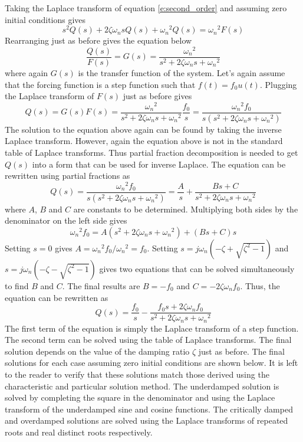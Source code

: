 Taking the Laplace transform of equation \ref{e:second_order} and assuming zero initial conditions gives
\begin{equation}
    s^2 Q(s) + 2\zeta \omega_n s Q(s) + {\omega_n}^2 Q(s) = {\omega_n}^2 F(s)
\end{equation}
Rearranging just as before gives the equation below 
\begin{equation}
    \frac{Q(s)}{F(s)} = G(s) = \frac{{\omega_n}^2}{s^2 + 2\zeta \omega_n s + {\omega_n}^2}
\end{equation}
where again $G(s)$ is the transfer function of the system. Let's again assume that the forcing function is a step function such that $f(t)=f_0u(t)$. Plugging the Laplace transform of $F(s)$ just as before gives
\begin{equation}
    Q(s) = G(s)F(s) = \frac{{\omega_n}^2}{s^2 + 2\zeta \omega_n s + {\omega_n}^2}\frac{f_0}{s} = \frac{{\omega_n}^2 f_0}{s(s^2 + 2\zeta \omega_n s + {\omega_n}^2)}
\end{equation}
The solution to the equation above again can be found by taking the inverse Laplace transform. However, again the equation above is not in the standard table of Laplace transforms. Thus partial fraction decomposition is needed to get $Q(s)$ into a form that can be used for inverse Laplace. The equation can be rewritten using partial fractions as
\begin{equation}
    Q(s) = \frac{{\omega_n}^2 f_0}{s(s^2 + 2\zeta \omega_n s + {\omega_n}^2)} = \frac{A}{s} + \frac{Bs + C}{s^2 + 2\zeta \omega_n s + {\omega_n}^2}
\end{equation}
where $A$, $B$ and $C$ are constants to be determined. Multiplying both sides by the denominator on the left side gives
\begin{equation}
    {\omega_n}^2 f_0 = A(s^2 + 2\zeta \omega_n s + {\omega_n}^2) + (Bs + C)s
\end{equation}
Setting $s=0$ gives $A={\omega_n}^2 f_0/{\omega_n}^2 = f_0$. Setting $s=j\omega_n(-\zeta + \sqrt{\zeta^2 - 1})$ and $s=j\omega_n(-\zeta - \sqrt{\zeta^2 - 1})$ gives two equations that can be solved simultaneously to find $B$ and $C$. The final results are $B=-f_0$ and $C=-2\zeta \omega_n f_0$. Thus, the equation can be rewritten as
\begin{equation}
    Q(s) = \frac{f_0}{s} - \frac{f_0 s + 2\zeta \omega_n f_0}{s^2 + 2\zeta \omega_n s + {\omega_n}^2}
\end{equation}
The first term of the equation is simply the Laplace transform of a step function. The second term can be solved using the table of Laplace transforms. The final solution depends on the value of the damping ratio $\zeta$ just as before. The final solutions for each case assuming zero initial conditions are shown below. It is left to the reader to verify that these solutions match those derived using the characteristic and particular solution method. The underdamped solution is solved by completing the square in the denominator and using the Laplace transform of the underdamped sine and cosine functions. The critically damped and overdamped solutions are solved using the Laplace transforms of repeated roots and real distinct roots respectively.
